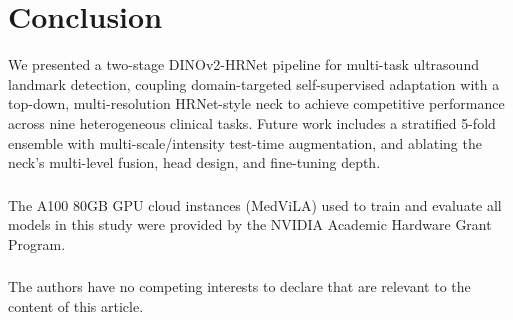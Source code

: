 \documentclass[runningheads]{llncs}
\begin{document}
\section{Conclusion}
We presented a two-stage DINOv2-HRNet pipeline for multi-task ultrasound landmark detection, coupling domain-targeted self-supervised adaptation with a top-down, multi-resolution HRNet-style neck to achieve competitive performance across nine heterogeneous clinical tasks. Future work includes a stratified 5-fold ensemble with multi-scale/intensity test-time augmentation, and ablating the neck's multi-level fusion, head design, and fine-tuning depth.

\begin{credits}
\subsubsection{\ackname} %
The A100 80GB GPU cloud instances (MedViLA) used to train and evaluate all models in this study were provided by the NVIDIA Academic Hardware Grant Program.
\subsubsection{\discintname}
The authors have no competing interests to declare that are relevant to
the content of this article.
\end{credits}

%
%
\clearpage


\end{document}
